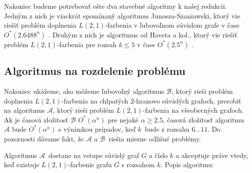 Nakoniec budeme potrebovať ešte dva stavebné algoritmy k našej redukcii. Jedným z nich je
viackrát spomínaný algoritmus Junosza-Szaniawski, ktorý vie riešiť problém doplnenia $L(2,1)$-farbenia
v ľubovoľnom súvislom grafe v čase $O^*(2.6488^n)$ \cite{junosza_fast}. Druhým z nich je algoritmus od Haveta
a kol., ktorý vie riešiť problém $L(2,1)$-farbenia pre rozsah $k \leq 5$ v čase $O^*(2.5^n)$ \cite{havet}.

\subsection{Algoritmus na rozdelenie problému}

Nakoniec ukážeme, ako môžeme ľubovoľný algoritmus $\mathcal{B}$, ktorý rieši problém doplnenia
$L(2,1)$-farbenia na chlpatých $2$-hranovo súvislých grafoch, prerobiť na algoritmus $\mathcal{A}$, ktorý
rieši problém $L(2,1)$-farbenia na všeobecných grafoch. Ak je časová zložitosť $\mathcal{B}$
$O^*(\alpha^n)$ pre nejaké $\alpha \ge 2.5$, časová zložitosť algoritmu $\mathcal{A}$ bude $O^*(\alpha^n)$
s výnimkou prípadov, keď $k$ bude z rozsahu $6 \ldots 11$. Do pozornosti dávame fakt, že
$\mathcal{A}$ a $\mathcal{B}$ riešia mierne odlišné problémy.

Algoritmus $\mathcal{A}$ dostane na vstupe súvislý graf $G$ a číslo $k$ a akceptuje práve vtedy,
keď existuje $L(2,1)$-farbenie grafu $G$ s rozsahom $k$. Popis algoritmu:


